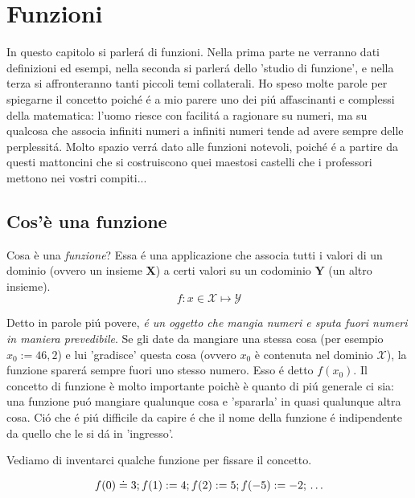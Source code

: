 \label{funzioni}
\chapter{Funzioni}

In questo capitolo si parler\'a di funzioni. Nella prima parte ne verranno dati definizioni ed esempi, 
nella seconda si parler\'a dello 'studio di funzione', e nella terza si affronteranno tanti piccoli temi
collaterali. Ho speso molte parole per spiegarne il concetto poich\'e \'e a mio parere uno dei pi\'u 
affascinanti e complessi della matematica: l'uomo riesce con facilit\'a a ragionare su numeri, ma su qualcosa
che associa infiniti numeri a infiniti numeri tende ad avere sempre delle perplessit\'a. Molto spazio verr\'a
dato alle funzioni notevoli, poich\'e \'e a partire da questi mattoncini che si costruiscono quei maestosi
castelli che i professori mettono nei vostri compiti...


\section{Cos'è una funzione}

Cosa è una {\em funzione}? Essa \'e una applicazione che associa tutti 
i valori di un dominio (ovvero un insieme $\mathbf{X}$) a certi valori su un 
codominio $\mathbf{Y}$ (un altro insieme). 
\begin{equation}
f: x \in \mathcal{X} \mapsto \mathcal{Y}
\end{equation}

Detto in parole pi\'u povere, {\em \'e un oggetto 
che mangia numeri e sputa fuori numeri in maniera prevedibile}. Se gli date da 
mangiare una stessa cosa (per esempio $x_0:=46,2$) e lui 'gradisce' questa 
cosa (ovvero $x_0$ è contenuta nel dominio $\mathcal{X}$), la funzione 
sparer\'a sempre fuori uno stesso numero. Esso \'e detto $f(x_0)$. Il concetto di funzione
è molto importante poichè è quanto di pi\'u generale ci sia: una funzione pu\'o 
mangiare qualunque cosa e 'spararla' in quasi qualunque altra cosa. Ci\'o che \'e pi\'u
difficile da capire \'e che il nome della funzione \'e indipendente da quello che le 
si d\'a in 'ingresso'.

Vediamo di inventarci qualche funzione per fissare il concetto.

\begin{equation}
 f(0) \doteq 3; \\
 f(1):=4; \\ 
 f(2):=5; \\ 
 f(-5):=-2; \\ 
  \ldots
\end{equation}

